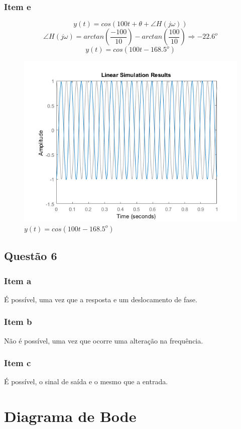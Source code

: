 \documentclass[a4paper, 12pt]{article}
\begin{document}
        \subsubsection{Item e}
        \[y(t) = cos(100t + \theta + \angle H(j\omega))\]
        \[\angle H(j\omega) = arctan \left(\frac{-100}{10}\right) - arctan \left(\frac{100}{10}\right) \Rightarrow -22.6^{o} \]
        \[y(t) = cos(100t -168.5^{o})\]         
		\begin{figure}[!ht]
			\centering
			\includegraphics{img/Q5d.png}
			\caption{$y(t) = cos(100t -168.5^{o})$}	
		\end{figure}	           
    \subsection{Quest\~{a}o 6}
        \subsubsection{Item a}
        É possível, uma vez que a resposta e um deslocamento de fase.
        \subsubsection{Item b}
        Não é possível, uma vez que ocorre uma alteração na frequência.
        \subsubsection{Item c}
        É possível, o sinal de saída e o mesmo que a entrada.
\section{Diagrama de Bode}
\end{document}
